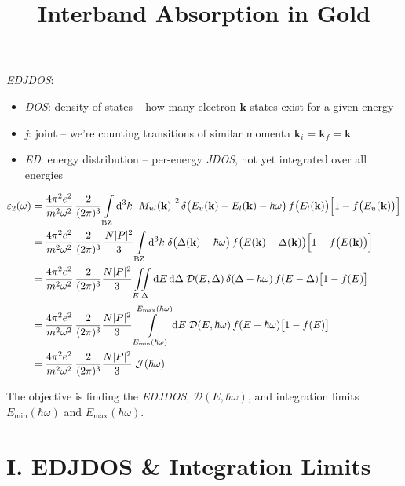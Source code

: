 \documentclass[11pt]{article}
\title{Interband Absorption in Gold}
\author{}
\date{}
\newcommand{\hw}{\hbar\omega}
\newcommand{\Dc}{\mathcal{D}}
\newcommand{\Jc}{\mathcal{J}}
\begin{document}
\maketitle

\textit{EDJDOS}:
\begin{itemize}
  \item \textit{DOS}: density of states -- how many electron $\mathbf{k}$ states exist for a given energy
  \item \textit{j}: joint -- we're counting transitions of similar momenta $\mathbf{k}_{i}=\mathbf{k}_{f}=\mathbf{k}$
  \item \textit{ED}: energy distribution -- per-energy \textit{JDOS}, not yet integrated over all energies
\end{itemize}

\begin{align*}
\varepsilon_2(\omega) &= \frac{4\pi^2 e^2}{m^2\omega^2}\,
\frac{2}{(2\pi)^3}\int\limits_{\rm BZ}\mathrm{d}^3k\;
\bigl|M_{ul}(\mathbf{k})\bigr|^{2}\,
\delta\bigl(E_u(\mathbf{k})-E_l(\mathbf{k})-\hw\bigr)\,
f\bigl(E_{l}(\mathbf{k})\bigr)\Bigl[1-f\bigl(E_u(\mathbf{k})\bigr)\Bigr] \\
&= \frac{4\pi^2 e^2}{m^2\omega^2}\,
\frac{2}{(2\pi)^3}\, \frac{N|P|^{2}}{3} \int\limits_{\rm BZ} \mathrm{d}^{3}k \;
\delta\bigl(\Delta(\mathbf{k})-\hw\bigr)\, f\bigl(E(\mathbf{k})-\Delta(\mathbf{k})\bigr)\Bigl[1-f\bigl(E(\mathbf{k})\bigr)\Bigr] \\
&= \frac{4\pi^2 e^2}{m^2\omega^2}\,
\frac{2}{(2\pi)^3} \frac{N|P|^{2}}{3} \iint\limits_{E,\Delta} \mathrm{d}E\,\mathrm{d}\Delta \;
\Dc(E,\Delta)\, \delta(\Delta-\hw)\, f(E-\Delta)\bigl[1-f(E)\bigr] \\
&= \frac{4\pi^2 e^2}{m^2\omega^2}\,
\frac{2}{(2\pi)^3} \frac{N|P|^{2}}{3} \int\limits_{E_{\rm min}(\hw)}^{E_{\rm max}(\hw)} \mathrm{d}E \;
\Dc(E, \hw)\, f(E-\hw)\bigl[1-f(E)\bigr] \\
&= \frac{4\pi^2 e^2}{m^2\omega^2}\,
\frac{2}{(2\pi)^3} \frac{N|P|^{2}}{3} \; \Jc(\hw)
\end{align*}

The objective is finding the \textit{EDJDOS}, $\Dc(E,\hw)$, and integration limits $E_{\mathrm{min}}(\hw)$ and $E_{\mathrm{max}}(\hw)$.

\section*{I. EDJDOS \& Integration Limits}
\end{document}
